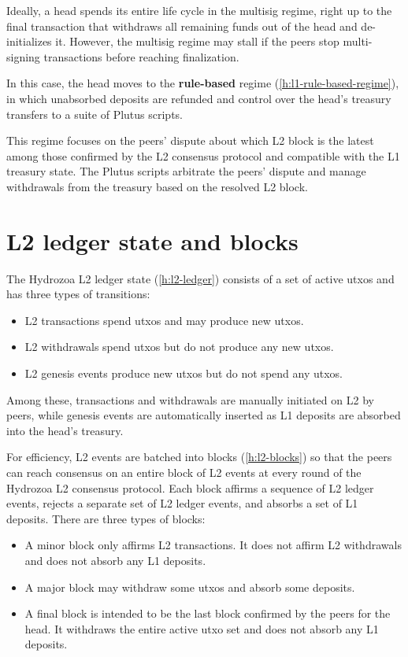\documentclass[../hydrozoa.tex]{subfiles}
\begin{document}
Ideally, a head spends its entire life cycle in the multisig regime, right up to the final transaction that withdraws all remaining funds out of the head and de-initializes it.
However, the multisig regime may stall if the peers stop multi-signing transactions before reaching finalization.

In this case, the head moves to the \textbf{rule-based} regime (\cref{h:l1-rule-based-regime}), in which unabsorbed deposits are refunded and control over the head's treasury transfers to a suite of Plutus scripts.

This regime focuses on the peers' dispute about which L2 block is the latest among those confirmed by the L2 consensus protocol and compatible with the L1 treasury state.
The Plutus scripts arbitrate the peers' dispute and manage withdrawals from the treasury based on the resolved L2 block.

\section*{L2 ledger state and blocks}%
\label{h:overview-l2-ledger-state-and-blocks}%
%

The Hydrozoa L2 ledger state (\cref{h:l2-ledger}) consists of a set of active utxos and has three types of transitions:
\begin{itemize}
  \item L2 transactions spend utxos and may produce new utxos.
  \item L2 withdrawals spend utxos but do not produce any new utxos.
  \item L2 genesis events produce new utxos but do not spend any utxos.
\end{itemize}

Among these, transactions and withdrawals are manually initiated on L2 by peers, while genesis events are automatically inserted as L1 deposits are absorbed into the head's treasury.

For efficiency, L2 events are batched into blocks (\cref{h:l2-blocks}) so that the peers can reach consensus on an entire block of L2 events at every round of the Hydrozoa L2 consensus protocol.
Each block affirms a sequence of L2 ledger events, rejects a separate set of L2 ledger events, and absorbs a set of L1 deposits.
There are three types of blocks:
\begin{itemize}
  \item A minor block only affirms L2 transactions. It does not affirm L2 withdrawals and does not absorb any L1 deposits.
  \item A major block may withdraw some utxos and absorb some deposits.
  \item A final block is intended to be the last block confirmed by the peers for the head. It withdraws the entire active utxo set and does not absorb any L1 deposits.
\end{itemize}
\end{document}

